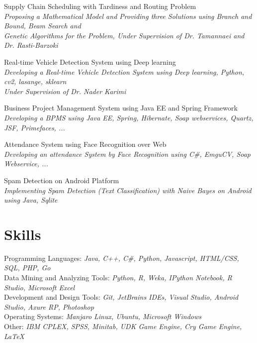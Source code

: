 \documentclass[a4paper,10pt]{article}
\newcommand{\skillItem}[2]{
	\textbullet\textnormal{ #1: }\emph{\color{darkgray}\small #2}}
\newcommand{\projectTitle}[1]{
	\textbullet\textnormal{ #1}}
\newcommand{\projectSubTitle}[1]{
	\emph{\color{darkgray}\small {\space\space\space\space\space}#1}}
\newcommand{\latexLogo}{
	{\fb \LaTeX}\setmainfont[SmallCapsFont=Fontin-SmallCaps.otf]{Fontin.otf}}
\begin{document}
		\projectTitle{ Supply Chain Scheduling with Tardiness and Routing Problem} \\
		\projectSubTitle{Proposing a Mathematical Model and Providing three Solutions using Branch and Bound, Beam Search and }\\
		\projectSubTitle{Genetic Algorithms for the Problem, Under Supervision of Dr. Tamannaei and Dr. Rasti-Barzoki}\vspace{1 mm}
		
		\projectTitle{ Real-time Vehicle Detection System using Deep learning} \\
		\projectSubTitle{Developing a Real-time Vehicle Detection System using Deep learning, Python, cv2, lasange, sklearn}\\
		\projectSubTitle{Under Supervision of Dr. Nader Karimi}\vspace{1 mm}
		
		\projectTitle{ Business Project Management System using Java EE and Spring Framework} \\
		\projectSubTitle{Developing a BPMS using Java EE, Spring, Hibernate, Soap webservices, Quartz, JSF, Primefaces, ...} \vspace{1 mm}
		
		\projectTitle{ Attendance System using Face Recognition over Web} \\
		\projectSubTitle{Developing an attendance System by Face Recognition using C\#, EmguCV, Soap Webservice, ...} \vspace{1 mm}
		

		\projectTitle{ Spam Detection on Android Platform} \\
		\projectSubTitle{Implementing Spam Detection (Text Classification) with Naive Bayes on Android using Java, Sqlite} \vspace{1 mm}
	\section{Skills}
		\skillItem{Programming Languages}{Java, C++, {C\#}, Python, Javascript, HTML/CSS, SQL, PHP, Go}\vspace{1 mm}\\
		\skillItem{Data Mining and Analyzing Tools}{Python, R, Weka, IPython Notebook, R Studio, Microsoft Excel}\vspace{1 mm}\\
		\skillItem{Development and Design Tools}{Git, JetBrains IDEs, Visual Studio, Android Studio, Axure RP, Photoshop}\vspace{1 mm}\\
		\skillItem{Operating Systems}{Manjaro Linux, Ubuntu, Microsoft Windows}\vspace{1 mm}\\
		\skillItem{Other}{IBM CPLEX, SPSS, Minitab, UDK Game Engine, Cry Game Engine, \latexLogo}\vspace{1 mm}
	 
\end{document}
